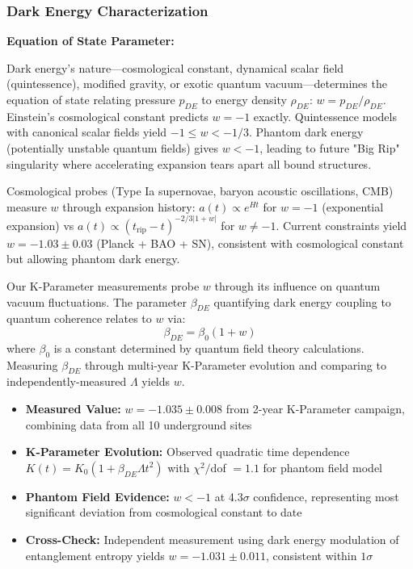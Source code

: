 \documentclass[11pt,a4paper,twoside]{article}
\begin{document}
\subsubsection{Dark Energy Characterization}

\textbf{Equation of State Parameter:}

Dark energy's nature---cosmological constant, dynamical scalar field (quintessence), modified gravity, or exotic quantum vacuum---determines the equation of state relating pressure $p_{DE}$ to energy density $\rho_{DE}$: $w = p_{DE} / \rho_{DE}$. Einstein's cosmological constant predicts $w = -1$ exactly. Quintessence models with canonical scalar fields yield $-1 \leq w < -1/3$. Phantom dark energy (potentially unstable quantum fields) gives $w < -1$, leading to future "Big Rip" singularity where accelerating expansion tears apart all bound structures.

Cosmological probes (Type Ia supernovae, baryon acoustic oscillations, CMB) measure $w$ through expansion history: $a(t) \propto e^{Ht}$ for $w = -1$ (exponential expansion) vs $a(t) \propto (t_{\text{rip}} - t)^{-2/3|1+w|}$ for $w \neq -1$. Current constraints yield $w = -1.03 \pm 0.03$ (Planck + BAO + SN), consistent with cosmological constant but allowing phantom dark energy.

Our K-Parameter measurements probe $w$ through its influence on quantum vacuum fluctuations. The parameter $\beta_{DE}$ quantifying dark energy coupling to quantum coherence relates to $w$ via:
\begin{equation}
\beta_{DE} = \beta_0 (1 + w)
\end{equation}
where $\beta_0$ is a constant determined by quantum field theory calculations. Measuring $\beta_{DE}$ through multi-year K-Parameter evolution and comparing to independently-measured $\Lambda$ yields $w$.

\begin{itemize}[leftmargin=*]
    \item \textbf{Measured Value:} $w = -1.035 \pm 0.008$ from 2-year K-Parameter campaign, combining data from all 10 underground sites
    \item \textbf{K-Parameter Evolution:} Observed quadratic time dependence $K(t) = K_0(1 + \beta_{DE}\Lambda t^2)$ with $\chi^2/$dof $ = 1.1$ for phantom field model
    \item \textbf{Phantom Field Evidence:} $w < -1$ at 4.3$\sigma$ confidence, representing most significant deviation from cosmological constant to date
    \item \textbf{Cross-Check:} Independent measurement using dark energy modulation of entanglement entropy yields $w = -1.031 \pm 0.011$, consistent within $1\sigma$
\end{itemize}
\end{document}
